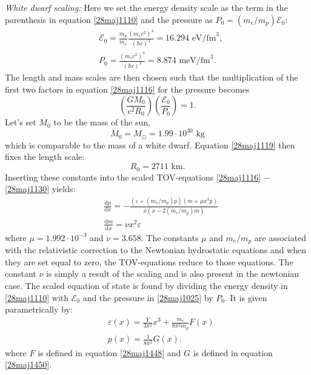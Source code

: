 \documentclass[twocolumn]{article}
\begin{document}
\begin{large}
\textit{White dwarf scaling:} Here we set the energy density scale as the term in the parenthesis in equation \eqref{28maj1110} and the pressure as $P_0 = (m_e/m_p)\mathcal{E}_0$:
\begin{equation}
\begin{split}
    &\mathcal{E}_0 = \frac{m_p}{m_e}\frac{(m_ec^2)^4}{(\hbar c)^3} = 16.294\text{ eV/fm}^3 , \\ 
    &P_0 = \frac{(m_ec^2)^4}{(\hbar c)^3} = 8.874\text{ meV/fm}^3.
    \end{split}
\end{equation}
The length and mass scales are then chosen such that the multiplication of the first two factors in equation \eqref{28maj1116} for the pressure becomes
\begin{equation}
    \label{28maj1119}
    \left(\frac{GM_0}{c^2R_0}\right)\left(\frac{\mathcal{E}_0}{P_0}\right) = 1.
\end{equation}
Let's set $M_0$ to be the mass of the sun, 
\begin{equation}
    M_0 = M_\odot = 1.99\cdot 10^{30} \text{ kg}
\end{equation}
which is comparable to the mass of a white dwarf. Equation \eqref{28maj1119} then fixes the length scale:
\begin{equation}
    R_0 = 2711 \text{ km}.
\end{equation}
Inserting these constants into the scaled TOV-equations \eqref{28maj1116} $-$ \eqref{28maj1130} yields:
\begin{equation}
    \label{28maj1427}
    \begin{split}
        &\frac{\text{d}p}{\text{d}x} = -\frac{(\varepsilon + (m_e/m_p)p)(m+\mu x^3p)}{x(x-2(m_e/m_p)m)} \\ 
        &\frac{\text{d}m}{\text{d}x} = \nu x^2\varepsilon
    \end{split}
\end{equation}
where $\mu = 1.992\cdot 10^{-3}$ and $\nu = 3.658$. The constants $\mu$ and $m_e/m_p$ are associated with the relativistic correction to the Newtonian hydrostatic equations and when they are set equal to zero, the TOV-equations reduce to those equations. The constant $\nu$ is simply a result of the scaling and is also present in the newtonian case. The scaled equation of state is found by dividing the energy density in \eqref{28maj1110} with $\mathcal{E}_0$ and the pressure in \eqref{28maj1025} by $P_0$. It is given parametrically by:
\begin{equation}
    \begin{split}
        &\varepsilon(x) = \frac{Y}{3\pi^2}x^3 + \frac{m_e}{8\pi^2 m_p}F(x) \\ 
        &p(x) = \frac{1}{8\pi^2}G(x).
    \end{split}
\end{equation}
where $F$ is defined in equation \eqref{28maj1448} and $G$ is defined in equation \eqref{28maj1450}.


\end{large}
\end{document}
